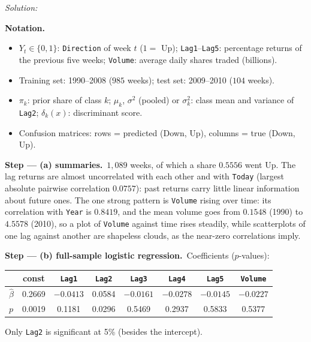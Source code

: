 \documentclass[11pt,a4paper]{article}
\newif\ifsolucoes
\newcommand{\espacoresol}{3.5cm}   %
\numberwithin{equation}{questao}   %
\newenvironment{notacao}{\par\smallskip\noindent\textbf{Notation.}\begin{itemize}[leftmargin=1.4em,topsep=1pt,itemsep=0pt]\small}{\end{itemize}}
\newcommand{\resolespaco}{\ifsolucoes\else\par\textit{Solution:}\vspace{\espacoresol}\par\fi}
\newcommand{\passo}[2]{\par\smallskip\noindent\textbf{Step --- #1.}~#2}
\begin{document}
\resolespaco
\begin{sol}
\begin{notacao}
\item $Y_t\in\{0,1\}$: \texttt{Direction} of week $t$ ($1=$ Up); \texttt{Lag1}--\texttt{Lag5}: percentage
  returns of the previous five weeks; \texttt{Volume}: average daily shares traded (billions).
\item Training set: 1990--2008 ($985$ weeks); test set: 2009--2010 ($104$ weeks).
\item $\pi_k$: prior share of class $k$; $\mu_k$, $\sigma^2$ (pooled) or $\sigma_k^2$: class mean and variance of \texttt{Lag2}; $\delta_k(x)$: discriminant score.
\item Confusion matrices: rows = predicted (Down, Up), columns = true (Down, Up).
\end{notacao}

\passo{(a) summaries}{$1{,}089$ weeks, of which a share $0.5556$ went Up. The lag returns are
almost uncorrelated with each other and with \texttt{Today} (largest absolute pairwise correlation
$0.0757$): past returns carry little linear information about future ones. The one strong pattern is
\texttt{Volume} rising over time: its correlation with \texttt{Year} is $0.8419$, and the mean
volume goes from $0.1548$ (1990) to $4.5578$ (2010), so a plot of \texttt{Volume} against time
rises steadily, while scatterplots of one lag against another are shapeless clouds, as the
near-zero correlations imply.}

\passo{(b) full-sample logistic regression}{Coefficients ($p$-values):
\begin{center}\begin{tabular}{lccccccc}\toprule
 & const & \texttt{Lag1} & \texttt{Lag2} & \texttt{Lag3} & \texttt{Lag4} & \texttt{Lag5} & \texttt{Volume}\\\midrule
$\hat\beta$ & 0.2669 & $-0.0413$ & 0.0584 & $-0.0161$ & $-0.0278$ & $-0.0145$ & $-0.0227$\\
$p$ & 0.0019 & 0.1181 & 0.0296 & 0.5469 & 0.2937 & 0.5833 & 0.5377\\\bottomrule\end{tabular}\end{center}
Only \texttt{Lag2} is significant at 5\% (besides the intercept).}


\end{sol}
\end{document}
